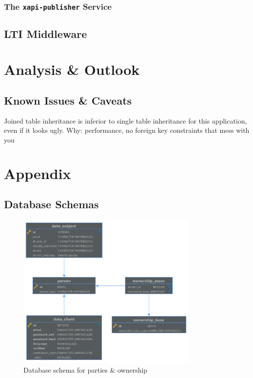 \documentclass[a4paper,11pt]{article}
\def\inline{\lstinline[basicstyle=\ttfamily,keywordstyle={}]}
\begin{document}
            \subsubsection{The \inline{xapi-publisher} Service}

        \subsection{LTI Middleware}
        
        \section{Analysis \& Outlook}
            \subsection{Known Issues \& Caveats}
                Joined table inheritance is inferior to single table inheritance
                for this application, even if it looks ugly. Why: performance,
                no foreign key constraints that mess with you



        \pagebreak
        \section{Appendix}
            \subsection{Database Schemas}
                \begin{figure}[H]
                    \centering
                    \includegraphics[width=0.8\textwidth]{schema-parties}
                    \caption{Database schema for parties \& ownership}
                    \label{fig:schema-parties}
                \end{figure}
\end{document}
